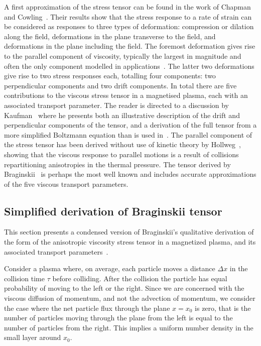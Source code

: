 A first approximation of the stress tensor can be found in the work of Chapman and Cowling~\cite{chapmanMathematicalTheoryNonuniform1970}. Their results show that the stress response to a rate of strain can be considered as responses to three types of deformation: compression or dilation along the field, deformations in the plane transverse to the field, and deformations in the plane including the field. The foremost deformation gives rise to the parallel component of viscosity, typically the largest in magnitude and often the only component modelled in applications~\cite{parrishEffectsAnisotropicViscosity2012a}. The latter two deformations give rise to two stress responses each, totalling four components: two perpendicular components and two drift components. In total there are five contributions to the viscous stress tensor in a magnetised plasma, each with an associated transport parameter. The reader is directed to a discussion by Kaufman~\cite{kaufmanPlasmaViscosityMagnetic1960} where he presents both an illustrative description of the drift and perpendicular components of the tensor, and a derivation of the full tensor from a more simplified Boltzmann equation than is used in~\cite{chapmanMathematicalTheoryNonuniform1970}. The parallel component of the stress tensor has been derived without use of kinetic theory by Hollweg~\cite{hollwegViscosityMagnetizedPlasma1985}, showing that the viscous response to parallel motions is a result of collisions repartitioning anisotropies in the thermal pressure. The tensor derived by Braginskii~\cite{braginskiiTransportProcessesPlasma1965} is perhaps the most well known and includes accurate approximations of the five viscous transport parameters.

\subsection{Simplified derivation of Braginskii tensor}

This section presents a condensed version of Braginskii's qualitative derivation of the form of the anisotropic viscosity stress tensor in a magnetized plasma, and its associated transport parameters~\cite{braginskiiTransportProcessesPlasma1965}. 

Consider a plasma where, on average, each particle moves a distance $\Delta x$ in the collision time $\tau$ before colliding. After the collision the particle has equal probability of moving to the left or the right. Since we are concerned with the viscous diffusion of momentum, and not the advection of momentum, we consider the case where the net particle flux through the plane $x=x_0$ is zero, that is the number of particles moving through the plane from the left is equal to the number of particles from the right. This implies a uniform number density in the small layer around $x_0$.

